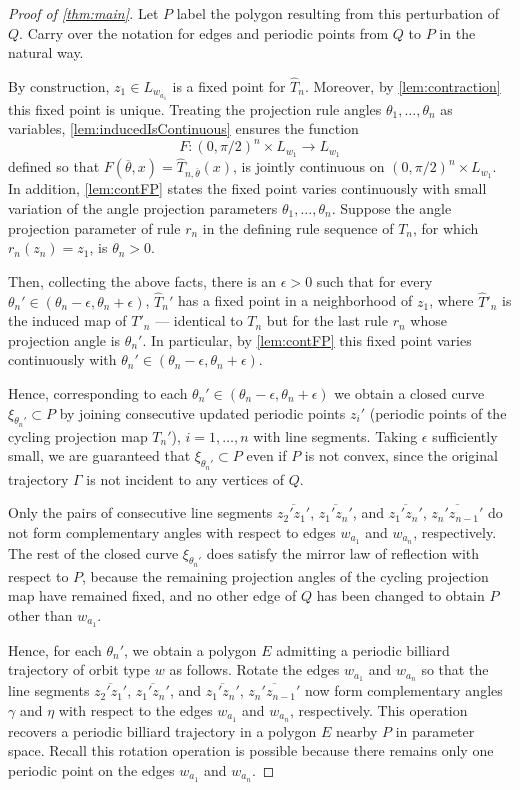 \documentclass[12pt]{amsart}
\theoremstyle{theorem}
\theoremstyle{remark}
\numberwithin{equation}{section}
\begin{document}
\begin{proof}[Proof of \cref{thm:main}]
Let $P$ label the polygon resulting from this perturbation of $Q$. Carry over the notation for edges and periodic points from $Q$ to $P$ in the natural way.

By construction, $z_1 \in L_{w_{a_1}}$ is a fixed point for $\hat{T}_n$. Moreover, by \cref{lem:contraction} this fixed point is unique.
Treating the projection rule angles $\theta_1,\dots,\theta_n$ as variables, \cref{lem:inducedIsContinuous} ensures the function
\[
F:(0,\pi/2)^n \times L_{w_1} \rightarrow L_{w_1}
\]
defined so that $F(\overline{\theta}, x) = \hat{T}_{n,\overline{\theta}}(x)$, is jointly continuous on $(0,\pi/2)^n \times L_{w_1}$.
In addition, \cref{lem:contFP} states the fixed point varies continuously with small variation of the angle projection parameters $\theta_1,\dots,\theta_n$.
Suppose the angle projection parameter of rule $r_n$ in the defining rule sequence of $T_n$, for which $r_n(z_{n}) = z_1$, is $\theta_n>0$.

Then, collecting the above facts, there is an $\epsilon>0$ such that for every $\theta_n' \in (\theta_n-\epsilon, \theta_n + \epsilon)$, $\hat{T}_n'$ has a fixed point in a neighborhood of $z_1$, where $\hat{T}'_n$ is the induced map of $T'_n$ --- identical to $T_n$ but for the last rule $r_n$ whose projection angle is $\theta_n'$.
In particular, by \cref{lem:contFP} this fixed point varies continuously with $\theta_n' \in (\theta_n - \epsilon, \theta_n + \epsilon)$.

Hence, corresponding to each $\theta_n' \in (\theta_n - \epsilon, \theta_n + \epsilon)$ we obtain a closed curve $\xi_{\theta_n'} \subset P$ by joining consecutive updated periodic points $z_{i}'$ (periodic points of the cycling projection map $T_n'$), $i=1,\dots,n$ with line segments.
Taking $\epsilon$ sufficiently small, we are guaranteed that $\xi_{\theta_n'} \subset P$ even if $P$ is not convex, since the original trajectory $\Gamma$ is not incident to any vertices of $Q$.

Only the pairs of consecutive line segments $\overline{z_2'z_1'}$, $\overline{z_1'z_n'}$, and $\overline{z_1'z_n'}$, $\overline{z_n'z_{n-1}'}$ do not form complementary angles with respect to edges $w_{a_1}$ and $w_{a_n}$, respectively. The rest of the closed curve $\xi_{\theta_n'}$ does satisfy the mirror law of reflection with respect to $P$, because the remaining projection angles of the cycling projection map have remained fixed, and no other edge of $Q$ has been changed to obtain $P$ other than $w_{a_1}$.

Hence, for each $\theta_n'$, we obtain a polygon $E$ admitting a periodic billiard trajectory of orbit type $w$ as follows. Rotate the edges $w_{a_1}$ and $w_{a_n}$ so that the line segments $\overline{z_2'z_1'}$, $\overline{z_1'z_n'}$, and $\overline{z_1'z_n'}$, $\overline{z_n'z_{n-1}'}$ now form complementary angles $\gamma$ and $\eta$ with respect to the edges $w_{a_1}$ and $w_{a_n}$, respectively. This operation recovers a periodic billiard trajectory in a polygon $E$ nearby $P$ in parameter space. Recall this rotation operation is possible because there remains only one periodic point on the edges $w_{a_1}$ and $w_{a_n}$.


\end{proof}
\end{document}
